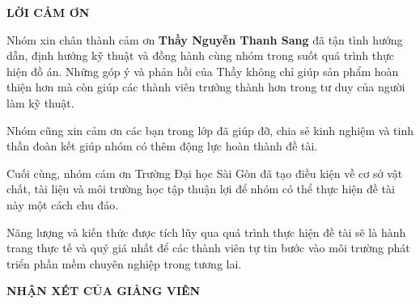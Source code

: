 \documentclass[a4paper]{article}
\begin{document}
\clearpage
{}

{}
\begin{center}
\Large\textbf{LỜI CẢM ƠN}
\end{center}

\vspace{1.5cm}

Nhóm xin chân thành cảm ơn \textbf{Thầy Nguyễn Thanh Sang} đã tận tình hướng dẫn, định hướng kỹ thuật và đồng hành cùng nhóm trong suốt quá trình thực hiện đồ án. Những góp ý và phản hồi của Thầy không chỉ giúp sản phẩm hoàn thiện hơn mà còn giúp các thành viên trưởng thành hơn trong tư duy của người làm kỹ thuật.

Nhóm cũng xin cảm ơn các bạn trong lớp đã giúp đỡ, chia sẻ kinh nghiệm và tinh thần đoàn kết giúp nhóm có thêm động lực hoàn thành đề tài.

Cuối cùng, nhóm cám ơn Trường Đại học Sài Gòn đã tạo điều kiện về cơ sở vật chất, tài liệu và môi trường học tập thuận lợi để nhóm có thể thực hiện đề tài này một cách chu đáo.

Năng lượng và kiến thức được tích lũy qua quá trình thực hiện đề tài sẽ là hành trang thực tế và quý giá nhất để các thành viên tự tin bước vào môi trường phát triển phần mềm chuyên nghiệp trong tương lai.

\clearpage

{}
\begin{center}
\Large\textbf{NHẬN XÉT CỦA GIẢNG VIÊN}
\end{center}

\noindent\dotfill

\noindent\dotfill

\noindent\dotfill

\noindent\dotfill

\noindent\dotfill

\noindent\dotfill

\noindent\dotfill

\noindent\dotfill

\noindent\dotfill

\clearpage
\end{document}
